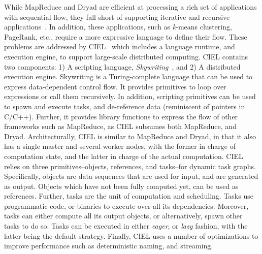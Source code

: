 \documentclass[a4paper,12pt,twoside,openright]{report}
\begin{document}
While MapReduce and Dryad are efficient at processing a rich set of applications
with sequential flow, they fall short of supporting iterative and recursive
applications~\cite{Bu:2010:HEI,Zaharia:2010:SCC}. In addition, these
applications, such as \emph{k}-means clustering, PageRank, etc., require a more
expressive language to define their flow. These problems are addressed by
CIEL~\cite{Murray:2011:CUE} which includes a language runtime, and execution
engine, to support large-scale distributed computing. CIEL contains two
components: 1) A scripting language, \emph{Skywriting}~\cite{Murray:2010:SCS},
and 2) A distributed execution engine. Skywriting is a Turing-complete language
that can be used to express data-dependent control flow. It provides primitives
to loop over expressions or call them recursively. In addition, scripting
primitives can be used to spawn and execute tasks, and de-reference data
(reminiscent of pointers in C/C++). Further, it provides library functions to
express the flow of other frameworks such as MapReduce, as CIEL subsumes both
MapReduce, and Dryad. Architecturally, CIEL is similar to MapReduce and Dryad,
in that it also has a single master and several worker nodes, with the former in
charge of computation state, and the latter in charge of the actual computation.
CIEL relies on three primitives--objects, references, and tasks--for dynamic
task graphs. Specifically, objects are data sequences that are used for input,
and are generated as output. Objects which have not been fully computed yet, can
be used as references. Further, tasks are the unit of computation and
scheduling. Tasks use programmatic code, or binaries to execute over all its
dependencies. Moreover, tasks can either compute all its output objects, or
alternatively, spawn other tasks to do so. Tasks can be executed in either
\emph{eager}, or \emph{lazy} fashion, with the latter being the default
strategy. Finally, CIEL uses a number of optimizations to improve performance
such as deterministic naming, and streaming.
\end{document}
